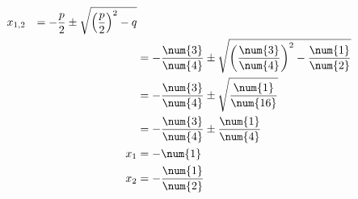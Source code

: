 \begin{exercise}
\begin{minipage}[t]{0.49\linewidth}
\begin{alignat*}{3}
          &
          x_{1,2}&=-\frac{p}{2}\pm\sqrt{\left(\frac{p}{2}\right)^2-q}
          &
          \nomod
          \\
          \noeq
          &
          &=-\frac{\num{3}}{\num{4}}\pm\sqrt{\left(\frac{\num{3}}{\num{4}}\right)^2-\frac{\num{1}}{\num{2}}}
          &
          \nomod
          \\
          \noeq
          &
          &=-\frac{\num{3}}{\num{4}}\pm\sqrt{\frac{\num{1}}{\num{16}}}
          &
          \nomod
          \\
          \noeq
          &
          &=-\frac{\num{3}}{\num{4}}\pm\frac{\num{1}}{\num{4}}
          &
          \nomod
          \\
          \noeq
          &
          x_1&=-\num{1}
          &
          \nomod
          \\
          \noeq
          &
          x_2&=-\frac{\num{1}}{\num{2}}
          &
          \nomod
        \end{alignat*}
      \endgroup
    \end{minipage}%
  \fi
\end{exercise}
